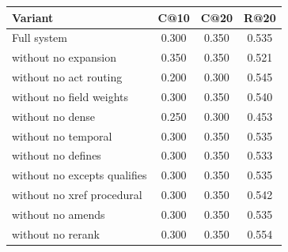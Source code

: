 \begin{tabular}{lccc}
\toprule
Variant & C@10 & C@20 & R@20 \\
\midrule
Full system & 0.300 & 0.350 & 0.535 \\
\quad without no expansion & 0.350 & 0.350 & 0.521 \\
\quad without no act routing & 0.200 & 0.300 & 0.545 \\
\quad without no field weights & 0.300 & 0.350 & 0.540 \\
\quad without no dense & 0.250 & 0.300 & 0.453 \\
\quad without no temporal & 0.300 & 0.350 & 0.535 \\
\quad without no defines & 0.300 & 0.350 & 0.533 \\
\quad without no excepts qualifies & 0.300 & 0.350 & 0.535 \\
\quad without no xref procedural & 0.300 & 0.350 & 0.542 \\
\quad without no amends & 0.300 & 0.350 & 0.535 \\
\quad without no rerank & 0.300 & 0.350 & 0.554 \\
\bottomrule
\end{tabular}
